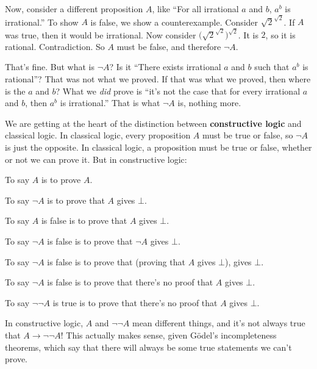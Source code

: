 \documentclass[11pt,paper=letter]{scrartcl}
\renewcommand{\lnot}{\neg}
\newcommand{\false}{\bot}
\begin{document}
Now, consider a different proposition $A$, like ``For all irrational $a$ and $b$, $a^b$ is irrational.'' To show $A$ is false, we show a counterexample. Consider $\sqrt{2}^{\sqrt{2}}$. If $A$ was true, then it would be irrational. Now consider $\Big(\sqrt{2}^{\sqrt{2}}\Big)^{\sqrt{2}}$. It is $2$, so it is rational. Contradiction. So $A$ must be false, and therefore $\lnot A$.

That's fine. But what is $\lnot A$? Is it ``There exists irrational $a$ and $b$ such that $a^b$ is rational''? That was not what we proved. If that was what we proved, then where is the $a$ and $b$? What we \emph{did} prove is ``it's not the case that for every irrational $a$ and $b$, then $a^b$ is irrational.'' That is what $\lnot A$ is, nothing more.



We are getting at the heart of the distinction between \textbf{constructive logic} and classical logic. In classical logic, every proposition $A$ must be true or false, so $\lnot A$ is just the opposite. In classical logic, a proposition must be true or false, whether or not we can prove it. But in constructive logic:
\begin{itemthin}
\item To say $A$ is to prove $A$.
\item To say $\lnot A$ is to prove that $A$ gives $\false$.
\item To say $A$ is false is to prove that $A$ gives $\false$.
\item To say $\lnot A$ is false is to prove that $\lnot A$ gives $\false$.
\item To say $\lnot A$ is false is to prove that (proving that $A$ gives $\false$), gives $\false$.
\item To say $\lnot A$ is false is to prove that there's no proof that $A$ gives $\false$.
\item To say $\lnot \lnot A$ is true is to prove that there's no proof that $A$ gives $\false$.
\end{itemthin}
In constructive logic, $A$ and $\lnot\lnot A$ mean different things, and it's not always true that $A \to \lnot\lnot A$! This actually makes sense, given Gödel's incompleteness theorems, which say that there will always be some true statements we can't prove.
\end{document}
